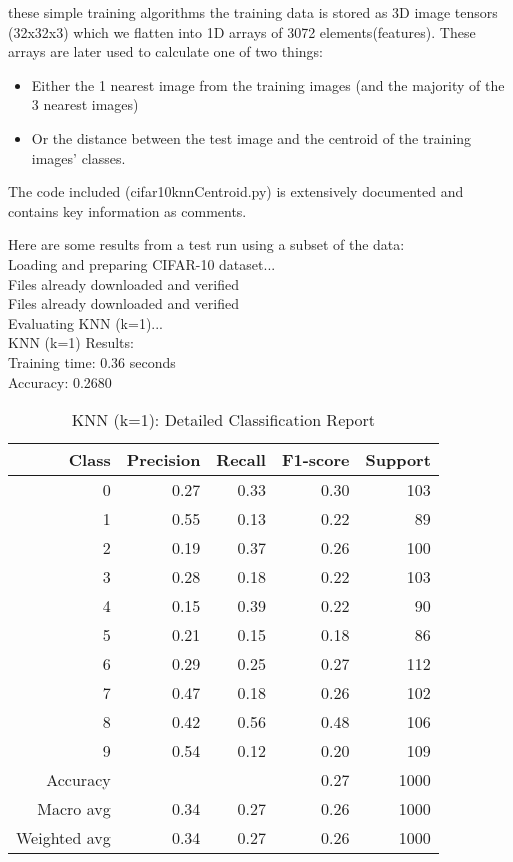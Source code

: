  these simple training algorithms the training data is stored as 3D image tensors (32x32x3) 
which we flatten into 1D arrays of 3072 elements(features). These arrays are later used to calculate 
one of two things:
\begin{itemize}
  \item Either the 1 nearest image from the training images (and the majority of the 3 nearest images)
  \item Or the distance between the test image and the centroid of the training images' classes.
\end{itemize}
The code included (cifar10knnCentroid.py) is extensively documented and contains key information 
as comments. 

Here are some results from a test run using a subset of the data:\\

Loading and preparing CIFAR-10 dataset...\\
Files already downloaded and verified\\
Files already downloaded and verified\\

Evaluating KNN (k=1)...\\

KNN (k=1) Results:\\
Training time: 0.36 seconds\\
Accuracy: 0.2680
\begin{table}[H]
  \centering
  \begin{tabular}{r r r r r} %
    \toprule
    Class & Precision & Recall & F1-score & Support \\
    \midrule
    0 & 0.27 & 0.33 & 0.30 & 103 \\
    1 & 0.55 & 0.13 & 0.22 & 89 \\
    2 & 0.19 & 0.37 & 0.26 & 100 \\
    3 & 0.28 & 0.18 & 0.22 & 103 \\
    4 & 0.15 & 0.39 & 0.22 & 90 \\
    5 & 0.21 & 0.15 & 0.18 & 86 \\
    6 & 0.29 & 0.25 & 0.27 & 112 \\
    7 & 0.47 & 0.18 & 0.26 & 102 \\
    8 & 0.42 & 0.56 & 0.48 & 106 \\
    9 & 0.54 & 0.12 & 0.20 & 109 \\
    \midrule
    Accuracy & & & 0.27 & 1000 \\
    Macro avg & 0.34 & 0.27 & 0.26 & 1000 \\
    Weighted avg & 0.34 & 0.27 & 0.26 & 1000 \\
    \bottomrule
  \end{tabular}
  \vspace{10pt}
  \caption{KNN (k=1): Detailed Classification Report}
\end{table}

